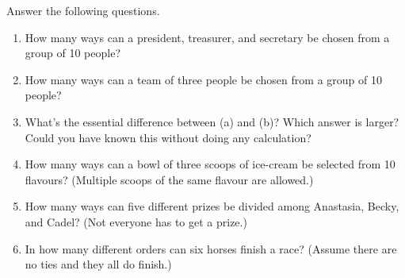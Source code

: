         \begin{exercise}
            Answer the following questions.
            \begin{enumerate}
                \item How many ways can a president, treasurer, and secretary be chosen from a group of 10 people?
                \item How many ways can a team of three people be chosen from a group of 10 people?
                \item What's the essential difference between (a) and (b)? Which answer is larger? Could you have known this without doing any calculation?
                \item How many ways can a bowl of three scoops of ice-cream be selected from 10 flavours? (Multiple scoops of the same flavour are allowed.)
                \item How many ways can five different prizes be divided among Anastasia, Becky, and Cadel? (Not everyone has to get a prize.)
                \item In how many different orders can six horses finish a race? (Assume there are no ties and they all do finish.)
            \end{enumerate}
        \end{exercise}
